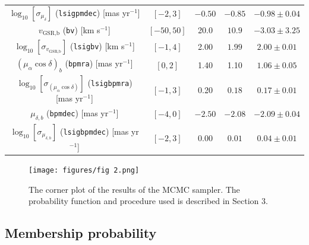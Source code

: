 \documentclass{article}
\begin{document}
\begin{table}[h]
\begin{center}
\begin{tabular}{ |c|c|c|c|c| }
$\log_{10}[\sigma_{\mu_{\delta}}]$ (\texttt{lsigpmdec}) [mas yr$^{-1}$]& $[-2,3]$ & $-0.50$ & $-0.85$ & $-0.98\pm0.04$\\
$v_\text{GSR,b}$ (\texttt{bv}) [km s$^{-1}$]& $[-50,50]$ & 20.0 & $10.9$ & $-3.03\pm3.25$\\
$\log_{10}[\sigma_{v_\text{GSR,b}}]$ (\texttt{lsigbv}) [km s$^{-1}$]& $[-1,4]$ & 2.00 & $1.99$ & $2.00\pm0.01$\\
$(\mu_\alpha\cos\delta)_b$ (\texttt{bpmra}) [mas yr$^{-1}$]& $[0,2]$ & 1.40 & 1.10 & $1.06\pm0.05$\\
$\log_{10}[\sigma_{(\mu_\alpha\cos\delta)}]$ (\texttt{lsigbpmra}) [mas yr$^{-1}$]& $[-1,3]$ & 0.20 & $0.18$ & $0.17\pm0.01$\\
$\mu_{\delta,b}$ (\texttt{bpmdec}) [mas yr$^{-1}$]& $[-4,0]$ & $-2.50$ & $-2.08$ & $-2.09\pm0.04$\\
$\log_{10}[\sigma_{\mu_{\delta,b}}]$ (\texttt{lsigbpmdec}) [mas yr$^{-1}$]& $[-2,3]$ & 0.00 & $0.01$ & $0.04\pm0.01$\\
\hline
\end{tabular}
\end{center}
\end{table}

\pagebreak

\begin{figure}[H]
\begin{center}
    \texttt{[image: figures/fig 2.png]}
\end{center}
    \vspace{-2em}
    \caption{The corner plot of the results of the MCMC sampler. The probability function and procedure used is described in Section 3.}
    \label{fig:2}
\end{figure}

\pagebreak

\subsection{Membership probability}
\end{document}
